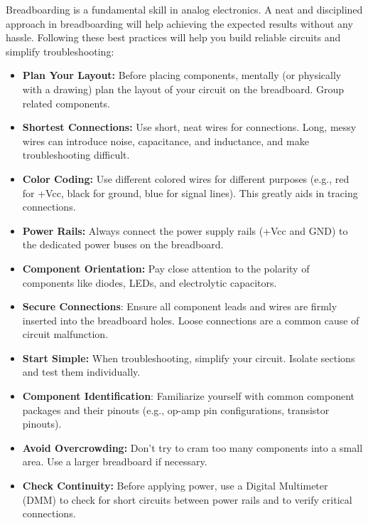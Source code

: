 Breadboarding is a fundamental skill in analog electronics. A neat and disciplined approach in breadboarding will help achieving the expected results without any hassle. Following these best practices will
help you build reliable circuits and simplify troubleshooting:
\begin{itemize}
	\item \textbf{Plan Your Layout:} Before placing components, mentally (or physically with a drawing)
	plan the layout of your circuit on the breadboard. Group related components.
	\item \textbf{Shortest Connections:} Use short, neat wires for connections. Long, messy wires can
	introduce noise, capacitance, and inductance, and make troubleshooting difficult.
	\item \textbf{Color Coding:} Use different colored wires for different purposes (e.g., red for +Vcc, black
	for ground, blue for signal lines). This greatly aids in tracing connections.
	\item \textbf{Power Rails:} Always connect the power supply rails (+Vcc and GND) to the dedicated
	power buses on the breadboard.
	\item \textbf{Component Orientation:} Pay close attention to the polarity of components like diodes,
	LEDs, and electrolytic capacitors.
	\item \textbf{Secure Connections}: Ensure all component leads and wires are firmly inserted into the
	breadboard holes. Loose connections are a common cause of circuit malfunction.
	\item \textbf{Start Simple:} When troubleshooting, simplify your circuit. Isolate sections and test them
	individually.
	\item \textbf{Component Identification}: Familiarize yourself with common component packages and
	their pinouts (e.g., op-amp pin configurations, transistor pinouts).
	\item \textbf{Avoid Overcrowding:} Don't try to cram too many components into a small area. Use a
	larger breadboard if necessary.
	\item \textbf{Check Continuity:} Before applying power, use a Digital Multimeter (DMM) to check for
	short circuits between power rails and to verify critical connections.
\end{itemize}
